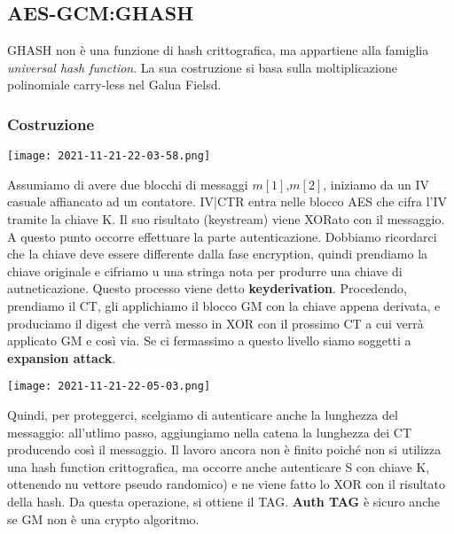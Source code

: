 \documentclass{article}
\theoremstyle{remark}
\begin{document}
\subsection{AES-GCM:GHASH}
GHASH non è una funzione di hash crittografica, ma appartiene alla famiglia \emph{universal hash function}. La sua costruzione si basa
sulla moltiplicazione polinomiale carry-less nel Galua Fielsd.
\subsubsection*{Costruzione}
\begin{center}
    \texttt{[image: 2021-11-21-22-03-58.png]}
\end{center}
Assumiamo di avere due blocchi di messaggi \(m[1]\),\(m[2]\), iniziamo da un IV casuale affiancato ad un contatore. IV|CTR entra nelle blocco
AES che cifra l'IV tramite la chiave K. Il suo risultato (keystream) viene XORato con il messaggio. A questo punto occorre effettuare la parte 
autenticazione. Dobbiamo ricordarci che la chiave deve essere differente dalla fase encryption, quindi prendiamo la chiave originale e cifriamo u
una stringa nota per produrre una chiave di autneticazione. Questo processo viene detto \textbf{keyderivation}.\newline
Procedendo, prendiamo il CT, gli applichiamo il blocco GM con la chiave appena derivata, e produciamo il digest che verrà messo in XOR con il 
prossimo CT a cui verrà applicato GM e così via. Se ci fermassimo a questo livello siamo soggetti a \textbf{expansion attack}.
\begin{center}
    \texttt{[image: 2021-11-21-22-05-03.png]}
\end{center}
Quindi, per proteggerci, scelgiamo di autenticare anche la lunghezza del messaggio: all'utlimo passo, aggiungiamo nella catena la lunghezza dei CT
producendo così il messaggio. Il lavoro ancora non è finito poiché non si utilizza una hash function crittografica, ma occorre anche autenticare 
S con chiave K, ottenendo nu vettore pseudo randomico) e ne viene fatto lo XOR con il risultato della hash. Da questa operazione, si ottiene il TAG.
\textbf{Auth TAG} è sicuro anche se GM non è una crypto algoritmo.
\end{document}
